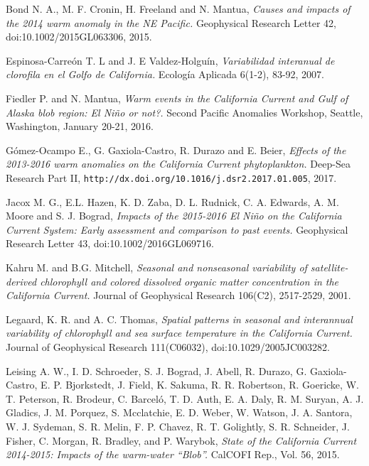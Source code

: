 \documentclass{article} %
\begin{document}
\begin{thebibliography}{10}

\hypertarget{bond}{}	 
Bond N. A., M. F. Cronin, H. Freeland and N. Mantua, 
\textit{Causes and impacts of the 2014 warm anomaly in the NE Pacific.} 
Geophysical Research Letter 42, doi:10.1002/2015GL063306, 2015. 
 
 \hypertarget{espinosa}{}	 
Espinosa-Carreón T. L and J. E Valdez-Holguín, 
\textit{Variabilidad interanual de clorofila en el Golfo de California.} 
Ecología Aplicada 6(1-2), 83-92, 2007.  

 \hypertarget{fiedler}{}
Fiedler P. and N. Mantua,
\textit{Warm events in the California Current and Gulf of Alaska blob region: El Niño or not?.} 
Second Pacific Anomalies Workshop, Seattle, Washington, January 20-21, 2016. 
 
 \hypertarget{gomez}{}
Gómez-Ocampo E., G. Gaxiola-Castro, R. Durazo and E. Beier,
\textit{Effects of the 2013-2016 warm anomalies on the California Current phytoplankton.} 
Deep-Sea Research Part II, \texttt{http://dx.doi.org/10.1016/j.dsr2.2017.01.005}, 2017.

 \hypertarget{jacox}{}
Jacox M. G., E.L. Hazen, K. D. Zaba, D. L. Rudnick, C. A. Edwards, A. M. Moore and S. J. Bograd,
\textit{Impacts of the 2015-2016 El Niño on the California Current System: Early assessment and comparison to past events.} 
Geophysical Research Letter 43, doi:10.1002/2016GL069716.
  
 \hypertarget{kahru}{}
Kahru M. and B.G. Mitchell,
\textit{Seasonal and nonseasonal variability of satellite-derived chlorophyll and colored dissolved organic matter concentration in the California Current.} 
Journal of Geophysical Research 106(C2), 2517-2529, 2001.


 \hypertarget{legaard}{}
Legaard, K. R. and A. C. Thomas,
\textit{Spatial patterns in seasonal and interannual variability of chlorophyll and sea surface temperature in the California Current.} 
Journal of Geophysical Research 111(C06032), doi:10.1029/2005JC003282.


 
 \hypertarget{leising}{}
Leising A. W., I. D. Schroeder, S. J. Bograd, J. Abell, R. Durazo, G. Gaxiola-Castro, E. P. Bjorkstedt, J. Field, K. Sakuma, R. R. Robertson, R. Goericke, W. T. Peterson, R. Brodeur, C. Barceló, T. D. Auth, E. A. Daly, R. M. Suryan, A. J. Gladics, J. M. Porquez, S. Mcclatchie, E. D. Weber, W. Watson, J. A. Santora, W. J. Sydeman, S. R. Melin, F. P. Chavez, R. T. Golightly, S. R. Schneider, J. Fisher, C. Morgan, R. Bradley, and P. Warybok,
\textit{State of the California Current 2014-2015: Impacts of the warm-water “Blob”.} 
CalCOFI Rep., Vol. 56, 2015.


\end{thebibliography}
\end{document}
